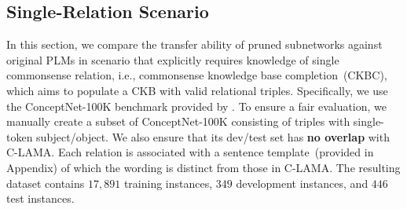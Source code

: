 \subsection{Single-Relation Scenario}
\label{sec:ckbc}
In this section, we compare the transfer ability of pruned subnetworks against original PLMs in scenario that explicitly requires knowledge of single commonsense relation, i.e., commonsense knowledge base completion~(CKBC), which aims to populate a CKB with valid relational triples. Specifically, we use the ConceptNet-100K benchmark provided by \citet{Li2016}. To ensure a fair evaluation, 
we manually create a subset of ConceptNet-100K 
consisting of triples with single-token subject/object. We also ensure that its dev/test set has \textbf{no overlap} with C-LAMA.
Each relation is associated with a sentence template~(provided in 
Appendix) of which the wording is distinct from 
those in C-LAMA. The resulting dataset contains 
$17,891$ training instances, $349$ development instances, 
and $446$ test instances.






